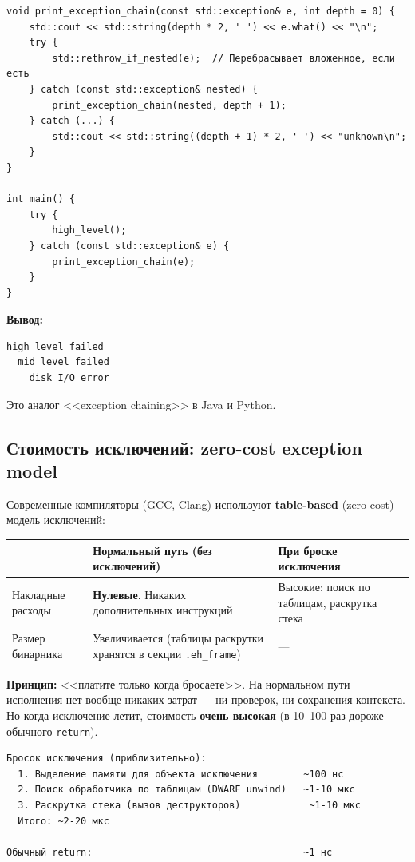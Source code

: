 \documentclass[a4paper,12pt]{article}
\begin{document}
\begin{lstlisting}
void print_exception_chain(const std::exception& e, int depth = 0) {
    std::cout << std::string(depth * 2, ' ') << e.what() << "\n";
    try {
        std::rethrow_if_nested(e);  // Перебрасывает вложенное, если есть
    } catch (const std::exception& nested) {
        print_exception_chain(nested, depth + 1);
    } catch (...) {
        std::cout << std::string((depth + 1) * 2, ' ') << "unknown\n";
    }
}

int main() {
    try {
        high_level();
    } catch (const std::exception& e) {
        print_exception_chain(e);
    }
}
\end{lstlisting}

\textbf{Вывод:}
\begin{lstlisting}[numbers=none]
high_level failed
  mid_level failed
    disk I/O error
\end{lstlisting}

Это аналог <<exception chaining>> в Java и Python.

\subsection{Стоимость исключений: zero-cost exception model}

Современные компиляторы (GCC, Clang) используют \textbf{table-based}
(zero-cost) модель исключений:

\begin{center}
\begin{tabular}{lp{5cm}p{5cm}}
\toprule
& \textbf{Нормальный путь} (без исключений) & \textbf{При броске исключения} \\
\midrule
Накладные расходы
    & \textbf{Нулевые}. Никаких дополнительных инструкций
    & Высокие: поиск по таблицам, раскрутка стека \\
\addlinespace
Размер бинарника
    & Увеличивается (таблицы раскрутки хранятся в секции \texttt{.eh\_frame})
    & --- \\
\bottomrule
\end{tabular}
\end{center}

\textbf{Принцип:} <<платите только когда бросаете>>. На нормальном пути
исполнения нет вообще никаких затрат --- ни проверок, ни сохранения контекста.
Но когда исключение летит, стоимость \textbf{очень высокая} (в 10--100 раз
дороже обычного \texttt{return}).

\begin{lstlisting}[numbers=none]
Бросок исключения (приблизительно):
  1. Выделение памяти для объекта исключения        ~100 нс
  2. Поиск обработчика по таблицам (DWARF unwind)   ~1-10 мкс
  3. Раскрутка стека (вызов деструкторов)            ~1-10 мкс
  Итого: ~2-20 мкс

Обычный return:                                     ~1 нс
\end{lstlisting}
\end{document}
